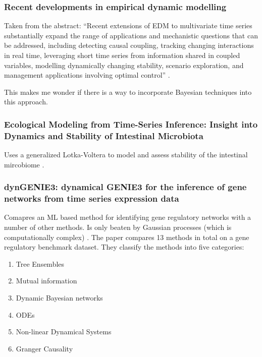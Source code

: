 \documentclass{article}
\begin{document}
    \subsubsection*{Recent developments in empirical dynamic modelling}

        Taken from the abstract: ``Recent extensions of EDM to multivariate
        time series substantially expand the range of applications and mechanistic
        questions that can be addressed, including detecting causal coupling, tracking
        changing interactions in real time, leveraging short time series from information shared
        in coupled variables, modelling dynamically changing stability, scenario exploration, and management
        applications involving optimal control'' \cite{munch2023recent}.

        This makes me wonder if there is a way to incorporate Bayesian techniques
        into this approach.

    \subsubsection*{Ecological Modeling from Time-Series Inference: Insight into Dynamics and Stability of Intestinal Microbiota}

        Uses a generalized Lotka-Voltera to model and assess stability of the intestinal mircobiome \cite{stein2013ecological}.
        
    \subsubsection*{dynGENIE3: dynamical GENIE3 for the inference of gene networks from time series expression data}
        Comapres an ML based method for identifying gene regulatory networks with a number of other methods. Is only
        beaten by Gaussian processes (which is computationally complex) \cite{huynhthu2018dynenie3}. The paper compares 
        13 methods in total on a gene regulatory benchmark dataset. They classify the methods into five categories:
        
        \begin{enumerate}
            \item Tree Ensembles
            \item Mutual information
            \item Dynamic Bayesian networks
            \item ODEs
            \item Non-linear Dynamical Systems
            \item Granger Causality
        \end{enumerate}
\end{document}
